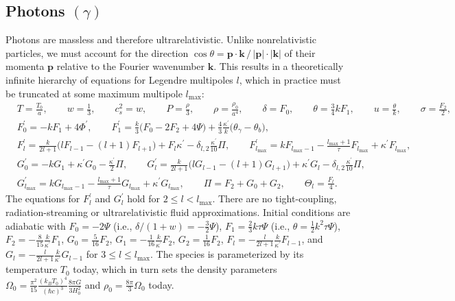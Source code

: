 \documentclass{aa}
\newcommand\lmax{l_\text{max}}
\begin{document}
\subsection{Photons \texorpdfstring{$(\gamma)$}{(γ)}}
\label{sec:photons}
Photons are massless and therefore ultrarelativistic.
Unlike nonrelativistic particles, we must account for the direction $\cos\theta = \boldsymbol{p} \cdot \boldsymbol{k} \,/\, \lvert\boldsymbol{p}\rvert \cdot \lvert\boldsymbol{k}\rvert$ of their momenta $\boldsymbol{p}$ relative to the Fourier wavenumber $\boldsymbol{k}$.
This results in a theoretically infinite hierarchy of equations for Legendre multipoles $l$, which in practice must be truncated at some maximum multipole $\lmax$:
\begin{align*}
&
T = \frac{{T_0}}{a} , \qquad
w = \frac{1}{3} , \qquad
{c_s^2} = w , \qquad
P = \frac{\rho}{3} , \qquad
\rho = \frac{\rho_0}{a^{4}} , \qquad
\delta = F_0 , \qquad
\theta = \frac{3}{4} k F_{1} , \qquad
u = \frac{\theta}{k}, \qquad
\sigma = \frac{F_2}{2} , \\
&
F_0^\prime = - k F_1 + 4 \Phi^\prime , \qquad
F_1^\prime = \frac{k}{3} \big( F_0 - 2 F_2 + 4 \Psi \big) + \frac{4}{3} \frac{\kappa^\prime}{k} \big( \theta_\gamma - {\theta_b} \big), \\
&
F_l^\prime = \frac{k}{2l+1} \big( l F_{l-1} - (l+1) F_{l+1} \big) + F_{l} {\kappa^\prime} - \delta_{l,2}\frac{\kappa^\prime}{10} \Pi , \qquad
F_{\lmax}^\prime = k F_{\lmax-1} - \frac{\lmax+1}{\tau} F_{\lmax} + {\kappa^\prime} F_{\lmax} , \\
&
G_0^\prime =  - k G_{1} + {\kappa^\prime} {G_0} - \frac{\kappa^\prime}{2} \Pi , \qquad
G_{l}^\prime = \frac{k}{2l+1} \big( l G_{l-1} - (l+1) G_{l+1} \big) + \kappa^\prime G_{l} - \delta_{l,2} \frac{{\kappa^\prime}}{10} \Pi  ,  \\
&
G_{\lmax}^\prime = k G_{\lmax-1} - \frac{\lmax+1}{\tau} G_{\lmax} + {\kappa^\prime} G_{\lmax} , \qquad
\Pi = F_{2} + G_0 + G_{2} , \qquad
{{\Theta}_l} = \frac{F_l}{4} .
\end{align*}
The equations for $F_l^\prime$ and $G_l^\prime$ hold for $2 \leq l < \lmax$.
There are no tight-coupling, radiation-streaming or ultrarelativistic fluid approximations.
Initial conditions are adiabatic with $F_0 = -2\Psi$ (i.e., $\delta/(1+w) = -\frac32 \Psi$), $F_1 = \frac23 k\tau \Psi$ (i.e., $\theta = \frac12 k^2 \tau \Psi$), $F_2 = -\frac{8}{15} \frac{k}{\kappa^\prime} F_1$, $G_0 = \frac{5}{16} F_2$, $G_1 = -\frac{1}{16} \frac{k}{\kappa^\prime} F_2$, $G_2 = \frac{1}{16} F_2$, $F_l = -\frac{l}{2l+1} \frac{k}{\kappa^\prime} F_{l-1}$, and $G_l = -\frac{l}{2l+1} \frac{k}{\kappa^\prime} G_{l-1}$ for $3 \leq l \leq \lmax$.
The species is parameterized by its temperature $T_0$ today, which in turn sets the density parameters $\Omega_0 = \frac{\pi^2}{15} \frac{(k_B T_0)^4}{(\hbar c)^3} \frac{8\pi G}{3H_0^2}$ and $\rho_0 = \frac{8\pi}{3}\Omega_0$ today.
\end{document}
